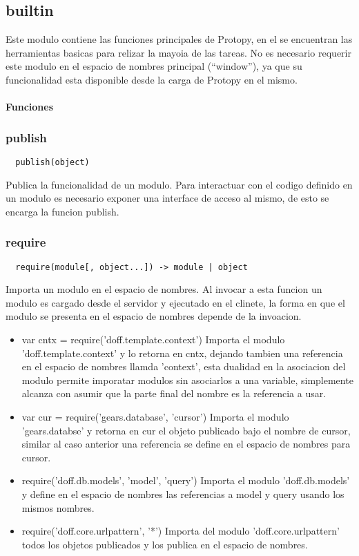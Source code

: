 \subsection{builtin}
Este modulo contiene las funciones principales de Protopy, en el se encuentran
las herramientas basicas para relizar la mayoia de las tareas.
No es necesario requerir este modulo en el espacio de nombres principal
(``window''), ya que su funcionalidad esta disponible desde la carga de Protopy
en el mismo.

\paragraph{Funciones}
\subsubsection*{publish}
\begin{verbatim}
  publish(object)
\end{verbatim}
Publica la funcionalidad de un modulo.
Para interactuar con el codigo definido en un modulo es necesario
exponer una interface de acceso al mismo, de esto se encarga la funcion publish.

\subsubsection*{require}
\begin{verbatim}
  require(module[, object...]) -> module | object
\end{verbatim} 
Importa un modulo en el espacio de nombres.
Al invocar a esta funcion un modulo es cargado desde el servidor y ejecutado en
el clinete, la forma en que el modulo se presenta en el espacio de nombres
depende de la invoacion.
\begin{itemize}
 \item{var cntx = require('doff.template.context')}
  Importa el modulo 'doff.template.context' y lo retorna en cntx, dejando
tambien una referencia en el espacio de nombres llamda 'context', esta dualidad
en la asociacion del modulo permite imporatar modulos sin asociarlos a una
variable, simplemente alcanza con asumir que la parte final del nombre es la
referencia a usar.
 \item{var cur = require('gears.database', 'cursor')}
  Importa el modulo 'gears.databse' y retorna en cur el objeto publicado bajo el
nombre de cursor, similar al caso anterior una referencia se define en el
espacio de nombres para cursor.  
 \item{require('doff.db.models', 'model', 'query')}
  Importa el modulo 'doff.db.models' y define en el espacio de nombres las
referencias a model y query usando los mismos nombres.
 \item{require('doff.core.urlpattern', '*')}
  Importa del modulo 'doff.core.urlpattern' todos los objetos publicados y los
publica en el espacio de nombres.
\end{itemize}

